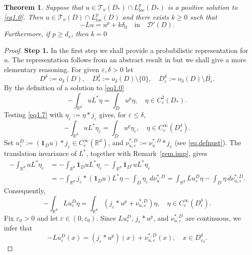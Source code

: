 \documentclass[11pt,a4paper,reqno]{amsart}
\newtheorem{theorem}{\bf Theorem}[section]
\theoremstyle{definition}
\numberwithin{equation}{section}
\begin{document}
\begin{theorem}
\label{th.main1}
Suppose that  $u\in \mathscr T_\nu(D_*)\cap L^p_{loc}(D_*)$  is  a positive
 solution to \eqref{eq1.0}.
Then 
 $u\in \mathscr T_\nu(D)\cap L^p_{loc}(D)$ and there exists $k\ge 0$  such that
\[
-Lu= u^p+k\delta_{0}\quad \text{in} \quad \mathscr D'(D).
\]
Furthermore, if $p\ge d_s$, then $k=0$ 
\end{theorem}
\begin{proof} 
\medskip 
\noindent 
\textbf{Step 1.} 
In the first step we shall provide  a probabilistic representation   for  $u$.
The representation follows from an abstract result in \cite{K:MAAN} but we shall give a more elementary reasoning.  
For given $\varepsilon,\delta>0$  let 
\[
D^\delta:=o_\delta(D),\quad D^\delta_*:=o_\delta(D)\setminus \{0\}, \quad D^\delta_\varepsilon:=o_\delta(D)\setminus \overline{B_{\varepsilon}}.
\]
By the definition of a  solution to \eqref{eq1.0} 
\begin{equation}
\label{eq1.7}
-\int_{\mathbb R^d}uL^*\eta=\int_{D}u^p\eta,\quad\eta\in C_c^2(D_*).
\end{equation}
Testing \eqref{eq1.7} with $\eta_\varepsilon:=\eta\ast j_\varepsilon$ gives,  for $\varepsilon\le\delta$,
\[
-\int_{\mathbb R^d}uL^*\eta_\varepsilon=\int_{D} u^p\eta_\varepsilon,\quad \eta\in C_c^{\infty}(D_\varepsilon^\delta).
\]
Set
$u^D_\varepsilon:=(\mathbf1_Du)\ast j_\varepsilon\in C_c^\infty(\mathbb R^d)$, and $\nu^{*,D}_{u,\varepsilon}:=\nu^{*,D}_u\ast j_\varepsilon$ (see  \eqref{eq.defnust}). 
The translation invariance of \(L^*\), together with Remark~\ref{rem.imp}, gives
\[
\begin{split}
-\int_{\mathbb R^d}u L^*\eta_\varepsilon&=-\int_{\mathbb R^d}\mathbf1_Du L^*\eta_\varepsilon
-\int_{\mathbb R^d}\mathbf1_{D^c}u L^*\eta_\varepsilon\\&=
-\int_{\mathbb R^d}j_\varepsilon\ast(\mathbf1_Du) L^*\eta-\int_{D}\eta_\varepsilon\,d\nu^{*,D}_u=\int_{\mathbb R^d}Lu^D_\varepsilon\eta-\int_{D}\eta\,d\nu^{*,D}_{u,\varepsilon}.
\end{split}
\]
Consequently,
\[
-\int_{\mathbb R^d}Lu^D_\varepsilon \eta=
\int_{\mathbb R^d}(j_\varepsilon\ast u^p+\nu^{*,D}_{u,\varepsilon})  \eta,\quad \eta\in C_c^{\infty}(D_\varepsilon^\delta).
\]
Fix $\varepsilon_0>0$ and let  $\varepsilon \in (0,\varepsilon_0)$.
Since \(Lu_\varepsilon^D\), \(j_\varepsilon*u^p\), and \(\nu_{u,\varepsilon}^{*,D}\) are continuous, 
we infer that 
\[
-Lu^D_\varepsilon(x)=(j_\varepsilon\ast u^p)(x)+\nu^{*,D}_{u,\varepsilon}(x),\quad x\in D_{\varepsilon_0}^\delta.
\]
\end{proof}
\end{document}
